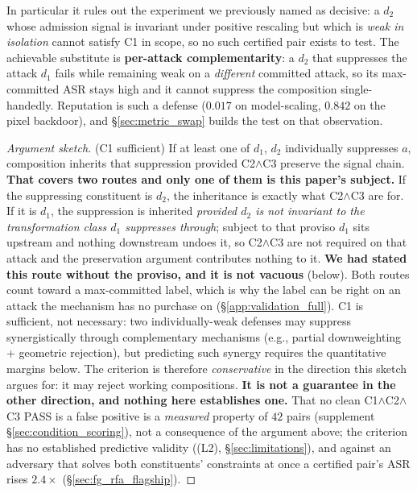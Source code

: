 \documentclass{article}
\begin{document}
In particular it rules out the experiment we previously named as decisive: a $d_2$ whose admission signal is invariant under positive rescaling but which is \emph{weak in isolation} cannot satisfy C1 in scope, so no such certified pair exists to test. The achievable substitute is \textbf{per-attack complementarity}: a $d_2$ that suppresses the attack $d_1$ fails while remaining weak on a \emph{different} committed attack, so its max-committed ASR stays high and it cannot suppress the composition single-handedly. Reputation is such a defense ($0.017$ on model-scaling, $0.842$ on the pixel backdoor), and §\ref{sec:metric_swap} builds the test on that observation.
\begin{proof}[Argument sketch]
(C1 sufficient) If at least one of $d_1$, $d_2$ individually suppresses $a$, composition inherits that suppression provided C2$\wedge$C3 preserve the signal chain. \textbf{That covers two routes and only one of them is this paper's subject.} If the suppressing constituent is $d_2$, the inheritance is exactly what C2$\wedge$C3 are for. If it is $d_1$, the suppression is inherited \emph{provided $d_2$ is not invariant to the transformation class $d_1$ suppresses through}; subject to that proviso $d_1$ sits upstream and nothing downstream undoes it, so C2$\wedge$C3 are not required on that attack and the preservation argument contributes nothing to it. \textbf{We had stated this route without the proviso, and it is not vacuous} (below). Both routes count toward a max-committed label, which is why the label can be right on an attack the mechanism has no purchase on (§\ref{app:validation_full}). C1 is sufficient, not necessary: two individually-weak defenses may suppress synergistically through complementary mechanisms (e.g., partial downweighting + geometric rejection), but predicting such synergy requires the quantitative margins below. The criterion is therefore \emph{conservative} in the direction this sketch argues for: it may reject working compositions. \textbf{It is not a guarantee in the other direction, and nothing here establishes one.} That no clean C1$\wedge$C2$\wedge$C3 PASS is a false positive is a \emph{measured} property of $42$ pairs (supplement §\ref{sec:condition_scoring}), not a consequence of the argument above; the criterion has no established predictive validity ((L2), §\ref{sec:limitations}), and against an adversary that solves both constituents' constraints at once a certified pair's ASR rises $2.4\times$ (§\ref{sec:fg_rfa_flagship}).


\end{proof}
\end{document}
